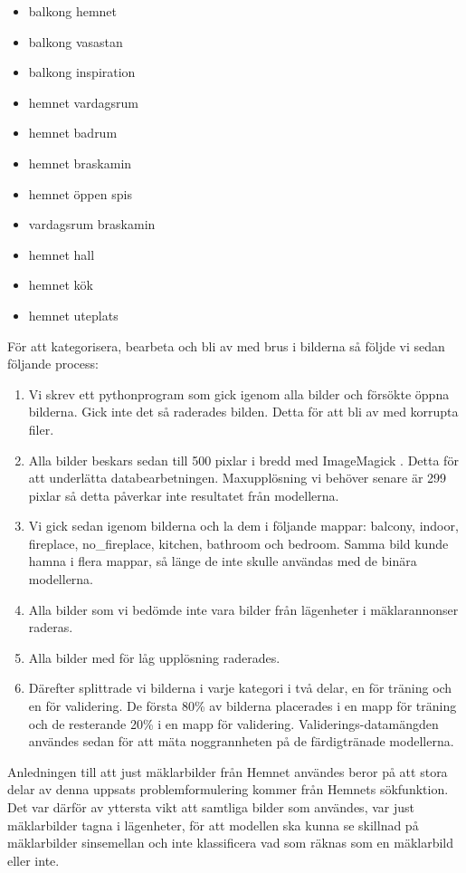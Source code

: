 \documentclass[]{kththesis}
\begin{document}
\begin{itemize}
  \item balkong hemnet
  \item balkong vasastan
  \item balkong inspiration
  \item hemnet vardagsrum
  \item hemnet badrum
  \item hemnet braskamin
  \item hemnet öppen spis
  \item vardagsrum braskamin
  \item hemnet hall
  \item hemnet kök
  \item hemnet uteplats
\end{itemize}


För att kategorisera, bearbeta och bli av med brus i bilderna så följde vi sedan följande process:
\begin{enumerate}
  \item Vi skrev ett pythonprogram som gick igenom alla bilder och försökte öppna bilderna. Gick inte det så raderades bilden. Detta för att bli av med korrupta filer.
  \item Alla bilder beskars sedan till 500 pixlar i bredd med ImageMagick \parencite{imagemagick}. Detta för att underlätta databearbetningen. Maxupplösning vi behöver senare är 299 pixlar så detta påverkar inte resultatet från modellerna.
  \item Vi gick sedan igenom bilderna och la dem i följande mappar: balcony, indoor, fireplace, no\_fireplace, kitchen, bathroom och bedroom. Samma bild kunde hamna i flera mappar, så länge de inte skulle användas med de binära modellerna.
  \item Alla bilder som vi bedömde inte vara bilder från lägenheter i mäklarannonser raderas.
  \item Alla bilder med för låg upplösning raderades.
  \item Därefter splittrade vi bilderna i varje kategori i två delar, en för träning och en för validering. De första 80\% av bilderna placerades i en mapp för träning och de resterande 20\% i en mapp för validering. Validerings-datamängden användes sedan för att mäta noggrannheten på de färdigtränade modellerna.
\end{enumerate}


Anledningen till att just mäklarbilder från Hemnet användes beror på att stora delar av denna uppsats problemformulering kommer från Hemnets sökfunktion. Det var därför av yttersta vikt att samtliga bilder som användes, var just mäklarbilder tagna i lägenheter, för att modellen ska kunna se skillnad på mäklarbilder sinsemellan och inte klassificera vad som räknas som en mäklarbild eller inte.
\end{document}
